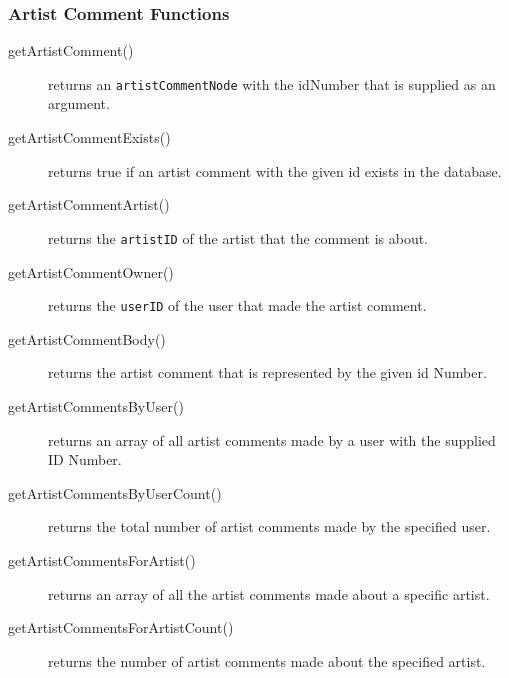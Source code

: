 \documentclass{article}
\begin{document}
\subsubsection{Artist Comment Functions}
\begin{description}
\item[getArtistComment()] returns an \verb|artistCommentNode| with the idNumber that is supplied as an argument. 
\item[getArtistCommentExists()] returns true if an artist comment with the given id exists in the database.
\item[getArtistCommentArtist()] returns the \verb|artistID| of the artist that the comment is about.
\item[getArtistCommentOwner()] returns the \verb|userID| of the user that made the artist comment.
\item[getArtistCommentBody()] returns the artist comment that is represented by the given id Number.
\item[getArtistCommentsByUser()] returns an array of all artist comments made by a user with the supplied ID Number.
\item[getArtistCommentsByUserCount()] returns the total number of artist comments made by the specified user.
\item[getArtistCommentsForArtist()] returns an array of all the artist comments made about a specific artist.
\item[getArtistCommentsForArtistCount()] returns the number of artist comments made about the specified artist.
\end{description}
\end{document}
